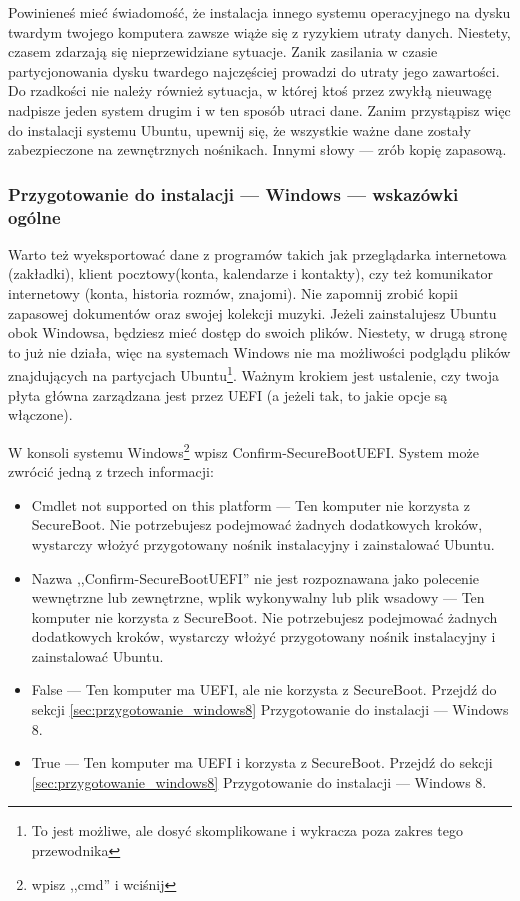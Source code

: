 \label{sec:przygotowanie_windows}Powinieneś mieć świadomość, że instalacja innego systemu operacyjnego na dysku twardym twojego komputera zawsze wiąże się z ryzykiem utraty danych. Niestety, czasem zdarzają się nieprzewidziane sytuacje. Zanik zasilania w czasie partycjonowania dysku twardego najczęściej prowadzi do utraty jego zawartości. Do rzadkości nie należy również sytuacja, w której ktoś przez zwykłą nieuwagę  nadpisze jeden system drugim i w ten sposób utraci dane. Zanim przystąpisz więc do instalacji systemu Ubuntu, upewnij się, że wszystkie ważne dane zostały zabezpieczone na zewnętrznych nośnikach. Innymi słowy --- zrób kopię zapasową.

\subsubsection{Przygotowanie do instalacji --- Windows --- wskazówki ogólne}
Warto też wyeksportować dane z programów takich jak przeglądarka internetowa (zakładki), klient pocztowy(konta, kalendarze i kontakty), czy też komunikator internetowy (konta, historia rozmów, znajomi). Nie zapomnij zrobić kopii zapasowej dokumentów oraz swojej kolekcji muzyki. Jeżeli zainstalujesz Ubuntu obok Windowsa, będziesz mieć dostęp do swoich plików. Niestety, w drugą stronę to już nie działa, więc na systemach Windows nie ma możliwości podglądu plików znajdujących na partycjach Ubuntu\footnote{To jest możliwe, ale dosyć skomplikowane i wykracza poza zakres tego przewodnika}.
Ważnym krokiem jest ustalenie, czy twoja płyta główna zarządzana jest przez UEFI (a jeżeli tak, to jakie opcje są włączone).

W konsoli systemu Windows\footnote{ wpisz ,,cmd'' i wciśnij \keys{\returnwin}} wpisz \textcolor{ubuntu_orange}{Confirm-SecureBootUEFI}. System może zwrócić jedną z trzech informacji:
\begin{itemize}
\item \textcolor{ubuntu_orange}{Cmdlet not supported on this platform} --- Ten komputer nie korzysta z SecureBoot. Nie potrzebujesz podejmować żadnych dodatkowych kroków, wystarczy włożyć przygotowany nośnik instalacyjny i zainstalować Ubuntu.
\item \textcolor{ubuntu_orange}{Nazwa ,,Confirm-SecureBootUEFI'' nie jest rozpoznawana jako polecenie wewnętrzne lub zewnętrzne, wplik wykonywalny lub plik wsadowy} --- Ten komputer nie korzysta z SecureBoot. Nie potrzebujesz podejmować żadnych dodatkowych kroków, wystarczy włożyć przygotowany nośnik instalacyjny i zainstalować Ubuntu.
\item \textcolor{ubuntu_orange}{False} --- Ten komputer ma UEFI, ale nie korzysta z SecureBoot. Przejdź do sekcji \ref{sec:przygotowanie_windows8} Przygotowanie do instalacji --- Windows 8.
\item \textcolor{ubuntu_orange}{True} --- Ten komputer ma UEFI i korzysta z SecureBoot. Przejdź do sekcji \ref{sec:przygotowanie_windows8} Przygotowanie do instalacji --- Windows 8.
\end{itemize}
